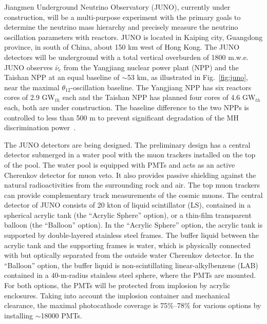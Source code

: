 Jiangmen Underground Neutrino Observatory (JUNO), currently under construction, will be a multi-purpose experiment with the primary goals to determine the neutrino mass hierarchy and precisely measure the neutrino oscillation parameters with reactors.
JUNO is located in Kaiping city, Guangdong province, in south of China, about 150 km west of Hong Kong. The JUNO detectors will be underground with a total vertical overburden of 1800 m.w.e. JUNO observes $\bar\nu_e$ from the Yangjiang nuclear power plant (NPP) and the Taishan NPP at an equal baseline of $\sim$53 km, as illustrated in Fig.~\ref{fig:juno}, near the maximal $\theta_{12}$-oscillation baseline. The Yangjiang NPP has six reactors cores of 2.9 GW$_{th}$ each and the Taishan NPP has planned four cores of 4.6 GW$_{th}$ each, both are under construction. The baseline difference to the two NPPs is controlled to less than 500 m to prevent significant degradation of the MH discrimination power~\cite{Li-PRD13}.

The JUNO detectors are being designed. The preliminary design has a central detector submerged in a water pool with the muon trackers installed on the top of the pool. 
The water pool is equipped with PMTs and acts as an active Cherenkov detector for muon veto. 
It also provides passive shielding against the natural radioactivities from the surrounding rock and air. 
The top muon trackers can provide complementary track measurements of the cosmic muons. 
The central detector of JUNO consists of 20 kton of liquid scintillator (LS), contained in a spherical acrylic tank (the ``Acrylic Sphere'' option), or a thin-film transparent balloon (the ``Balloon'' option). 
In the ``Acrylic Sphere'' option, the acrylic tank is supported by double-layered stainless steel frames. 
The buffer liquid between the acrylic tank and the supporting frames is water, which is physically connected with but optically separated from the outside water Cherenkov detector. 
In the ``Balloon'' option, the buffer liquid is non-scintillating linear-alkylbenzene (LAB) contained in a 40-m-radius stainless steel sphere, where the PMTs are mounted. 
For both options, the PMTs will be protected from implosion by acrylic enclosures. 
Taking into account the implosion container and mechanical clearance, the maximal photocathode coverage is 75\%--78\% for various options by installing $\sim$18000 PMTs.

